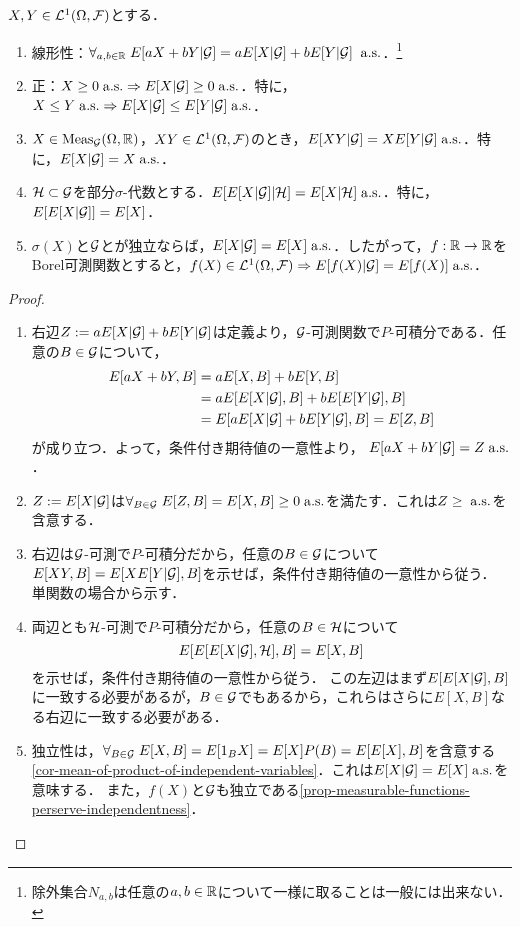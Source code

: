 \documentclass[uplatex,dvipdfmx]{jsreport}
\begin{document}
\begin{lemma}
    $X,Y\in\mathcal{L}^1(\Omega,\mathcal{F})$とする．
    \begin{enumerate}
        \item 線形性：$\forall_{a,b\in\mathbb{R}}\;E[aX+bY|\mathcal{G}]=aE[X|\mathcal{G}]+bE[Y|\mathcal{G}]\;\;\mathrm{a.s.}$．\footnote{除外集合$N_{a,b}$は任意の$a,b\in\mathbb{R}$について一様に取ることは一般には出来ない．}
        \item 正：$X\ge0\;\mathrm{a.s.}\Rightarrow E[X|\mathcal{G}]\ge0\;\mathrm{a.s.}$．特に，$X\le Y\;\mathrm{a.s.}\Rightarrow E[X|\mathcal{G}]\le E[Y|\mathcal{G}]\;\mathrm{a.s.}$．
        \item $X\in\mathrm{Meas}_{\mathcal{G}}(\Omega,\mathbb{R})$，$XY\in\mathcal{L}^1(\Omega,\mathcal{F})$のとき，$E[XY|\mathcal{G}]=XE[Y|\mathcal{G}]\;\mathrm{a.s.}$．特に，$E[X|\mathcal{G}]=X\;\mathrm{a.s.}$．
        \item $\mathcal{H}\subset\mathcal{G}$を部分$\sigma$-代数とする．$E[E[X|\mathcal{G}]|\mathcal{H}]=E[X|\mathcal{H}]\;\mathrm{a.s.}$．特に，$E[E[X|\mathcal{G}]]=E[X]$．
        \item $\sigma(X)$と$\mathcal{G}$とが独立ならば，$E[X|\mathcal{G}]=E[X]\;\mathrm{a.s.}$．したがって，$f:\mathbb{R}\to\mathbb{R}$をBorel可測関数とすると，$f(X)\in\mathcal{L}^1(\Omega,\mathcal{F})\Rightarrow E[f(X)|\mathcal{G}]=E[f(X)]\;\mathrm{a.s.}$．
    \end{enumerate}
\end{lemma}
\begin{proof}\mbox{}
    \begin{enumerate}
        \item 右辺$Z:=aE[X|\mathcal{G}]+bE[Y|\mathcal{G}]$は定義より，$\mathcal{G}$-可測関数で$P$-可積分である．任意の$B\in\mathcal{G}$について，
        \begin{align*}
            E[aX+bY,B]&=aE[X,B]+bE[Y,B]\\
            &=aE[E[X|\mathcal{G}],B]+bE[E[Y|\mathcal{G}],B]\\
            &=E[aE[X|\mathcal{G}]+bE[Y|\mathcal{G}],B]=E[Z,B]
        \end{align*}
        が成り立つ．よって，条件付き期待値の一意性より，
        $E[aX+bY|\mathcal{G}]=Z\;\mathrm{a.s.}$．
        \item $Z:=E[X|\mathcal{G}]$は$\forall_{B\in\mathcal{G}}\;E[Z,B]=E[X,B]\ge0\;\mathrm{a.s.}$を満たす．これは$Z\ge\;\mathrm{a.s.}$を含意する．
        \item 右辺は$\mathcal{G}$-可測で$P$-可積分だから，任意の$B\in\mathcal{G}$について$E[XY,B]=E[XE[Y|\mathcal{G}],B]$を示せば，条件付き期待値の一意性から従う．
        単関数の場合から示す．
        \item 両辺とも$\mathcal{H}$-可測で$P$-可積分だから，任意の$B\in\mathcal{H}$について
        \[E[E[E[X|\mathcal{G}],\mathcal{H}],B]=E[X,B]\]
        を示せば，条件付き期待値の一意性から従う．
        この左辺はまず$E[E[X|\mathcal{G}],B]$に一致する必要があるが，$B\in\mathcal{G}$でもあるから，これらはさらに$E[X,B]$なる右辺に一致する必要がある．
        \item 独立性は，$\forall_{B\in\mathcal{G}}\;E[X,B]=E[1_BX]=E[X]P(B)=E[E[X],B]$を含意する\ref{cor-mean-of-product-of-independent-variables}．これは$E[X|\mathcal{G}]=E[X]\;\mathrm{a.s.}$を意味する．
        また，$f(X)$と$\mathcal{G}$も独立である\ref{prop-measurable-functions-perserve-independentness}．
    \end{enumerate}
\end{proof}
\end{document}
